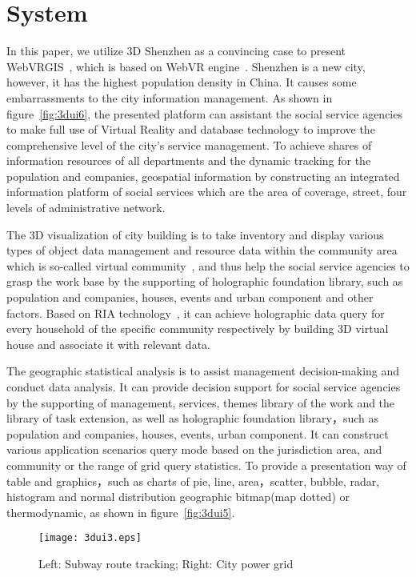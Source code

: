 \documentclass{vgtc}
\begin{document}
\section{System}

In this paper, we utilize 3D Shenzhen as a convincing case to present WebVRGIS~\cite{lviconip}, which is based on WebVR engine~\cite{lv2011webvr}. Shenzhen is a new city, however, it has the highest population density in China. It causes some embarrassments to the city information management.
As shown in figure~\ref{fig:3dui6}, the presented platform can assistant the social service agencies to make full use of Virtual Reality and database technology to improve the comprehensive level of the city's service management. To achieve shares of information resources of all departments and the dynamic tracking for the population and companies, geospatial information by constructing an integrated information platform of social services which are the area of coverage, street, four levels of administrative network.

The 3D visualization of city building is to take inventory and display various types of object data management and resource data within the community area which is so-called virtual community~\cite{lu2013webvrgis}, and thus help the social service agencies to grasp the work base by the supporting of holographic foundation library, such as population and companies, houses, events and urban component and other factors. Based on RIA technology~\cite{zhang2009research}, it can achieve holographic data query for every household of the specific community respectively by building 3D virtual house and associate it with relevant data.

The geographic statistical analysis is to assist management decision-making and conduct data analysis. It can provide decision support for social service agencies by the supporting of management, services, themes library of the work and the library of task extension, as well as holographic foundation library，such as population and companies, houses, events, urban component. It can construct various application scenarios query mode based on the jurisdiction area, and community or the range of grid query statistics. To provide a presentation way of table and graphics，such as charts of pie, line, area，scatter, bubble, radar, histogram and normal distribution geographic bitmap(map dotted) or thermodynamic, as shown in figure~\ref{fig:3dui5}.


\begin{figure}
    \begin{center}
    \texttt{[image: 3dui3.eps]}
    \caption{Left: Subway route tracking; Right: City power grid}
    \label{fig:3dui3}
        \end{center}
\end{figure}
\end{document}
